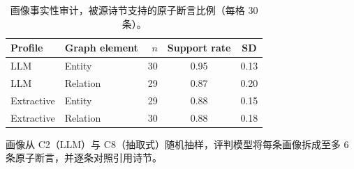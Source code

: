 \begin{table}[H]
\centering
\caption{画像事实性审计，被源诗节支持的原子断言比例（每格 30 条）。}
\label{tab:profiles}
\small
\begin{threeparttable}
\begin{tabular}{@{}l l r c c@{}}
\toprule
Profile & Graph element & $n$ & Support rate & SD \\
\midrule
LLM & Entity & 30 & 0.95 & 0.13 \\
LLM & Relation & 29 & 0.87 & 0.20 \\
Extractive & Entity & 29 & 0.88 & 0.15 \\
Extractive & Relation & 30 & 0.88 & 0.18 \\
\bottomrule
\end{tabular}
\begin{tablenotes}\scriptsize
\item 画像从 C2（LLM）与 C8（抽取式）随机抽样，评判模型将每条画像拆成至多 6 条原子断言，并逐条对照引用诗节。
\end{tablenotes}
\end{threeparttable}
\end{table}
